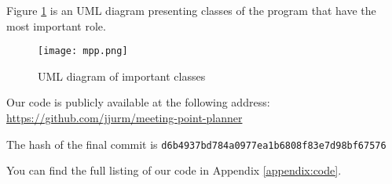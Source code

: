 Figure \ref{uml} is an UML diagram presenting classes of the program that have the most important role.

\begin{figure}[ht]
    \centering
        \texttt{[image: mpp.png]}
    \caption{UML diagram of important classes}
    \label{uml}
\end{figure}

Our code is publicly available at the following address:\\ \url{https://github.com/jjurm/meeting-point-planner}

The hash of the final commit is \texttt{d6b4937bd784a0977ea1b6808f83e7d98bf67576}

You can find the full listing of our code in Appendix \ref{appendix:code}.